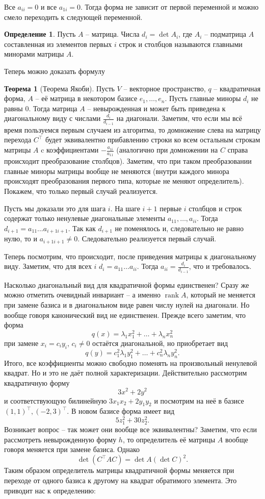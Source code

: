 \documentclass[10pt,a4paper,oneside]{book} %
\theoremstyle{definition}
\newtheorem*{defn}{Определение}
\newtheorem{thm}{Теорема}
\newcommand{\rank}{\operatorname{rank}}
\def\thrm{\begin{thm}}
\def\ethrm{\end{thm}}
\def\dfn{\begin{defn}}
\def\edfn{\end{defn}}
\begin{document}
 Все $a_{ii}=0$ и все $a_{1i}=0$. Тогда форма не зависит от первой переменной и можно смело переходить к следующей переменной.\\ 

\dfn Пусть $A$ -- матрица. Числа $d_i=\det A_i$, где $A_i$ -- подматрица $A$ составленная из элементов первых $i$ строк и столбцов  называются главными минорами матрицы $A$.
\edfn


Теперь можно доказать формулу 
\thrm[Теорема Якоби]
Пусть $V$ -- векторное пространство, $q$ -- квадратичная форма, $A$ -- её матрица в некотором базисе $e_1,\dots,e_n$. Пусть главные миноры $d_i$ не равны 0. 
Тогда матрица $A$ -- невырожденная и может быть приведена к диагональному виду с числами $\frac{d_{i}}{d_{i-1}}$ на диагонали.
\proof Заметим, что если мы всё время пользуемся первым случаем из алгоритма, то домножение слева на матрицу перехода $C^{\top}$ будет эквивалентно прибавлению строки ко всем остальным строкам матрицы $A$ c коэффициентами $-\frac{a_{1i}}{a_{11}}$ (аналогично при домножении на $C$ справа происходит преобразование столбцов). Заметим, что при таком преобразовании главные миноры матрицы вообще не меняются (внутри каждого минора происходят преобразования первого типа, которые не меняют определитель). Покажем, что только первый случай реализуется. 

Пусть мы доказали это для шага $i$. На шаге $i+1$ первые $i$ столбцов и строк содержат только ненулевые диагональные элементы $a_{11},\dots, a_{ii}$. Тогда $d_{i+1}=a_{11}\dots a_{i+1 i+1}$. Так как $d_{i+1}$ не  поменялось и, следовательно не равно нулю, то и $a_{i+1 i+1} \neq 0$. Следовательно реализуется первый случай. 

Теперь посмотрим, что происходит, после приведения матрицы к диагональному виду. Заметим, что для всех $i$ $d_i=a_{11}\dots a_{ii}$. Тогда $a_{ii}=\frac{d_i}{d_{i-1}}$, что и требовалось.
\endproof
\ethrm




Насколько диагональный вид для квадратичной формы единственен? Сразу же можно отметить очевидный инвариант -- а именно $\rank A$, который не меняется при замене базиса и в диагональном виде равен числу нулей на диагонали. Но вообще говоря канонический вид не единственен. Прежде всего заметим, что форма 
$$q(x)=\lambda_1 x_1^2+\dots+\lambda_nx_n^2$$
при замене $x_i=c_i y_i$, $c_i\neq 0$ остаётся диагональной, но приобретает вид 
$$q(y)=c_1^2\lambda_1y_1^2+\dots+c_n^2\lambda_ny_n^2.$$
Итого, все коэффициенты можно свободно поменять на произвольный ненулевой квадрат. Но и это не даёт полной характеризации. Действительно  рассмотрим квадратичную форму
$$3x^2+2y^2$$
и соответствующую билинейную $3x_1x_2+2y_1y_2$ и посмотрим на неё в базисе $(1,1)^{\top}, (-2,3)^{\top}$. В новом базисе форма имеет вид
$$5z_1^2+30z_2^2.$$
Возникает вопрос -- так может они вообще все эквивалентны? Заметим, что если рассмотреть невырожденную форму $h$, то определитель её матрицы $A$ вообще говоря меняется при замене базиса. Однако 
$$\det(C^{\top}AC)=\det A (\det C)^2.$$
Таким образом определитель матрицы квадратичной формы меняется при переходе от одного базиса к другому на квадрат обратимого элемента. Это приводит нас к определению:
\end{document}
